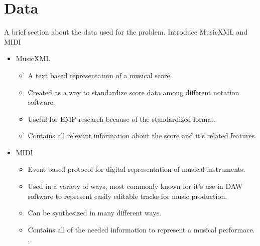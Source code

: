 
\section{Data}
A brief section about the data used for the problem. Introduce MusicXML and MIDI
\begin{itemize}
    \item MusicXML
    \begin{itemize}
        \item A text based representation of a musical score. 
        \item Created as a way to standardize score data among different notation software. 
        \item Useful for EMP research because of the standardized format. 
        \item Contains all relevant information about the score and it's related features. 
    \end{itemize}
    \item MIDI 
    \begin{itemize}
        \item Event based protocol for digital representation of musical instruments. 
        \item Used in a variety of ways, most commonly known for it's use in DAW software to represent easily editable tracks for music production. 
        \item Can be synthesized in many different ways. 
        \item Contains all of the needed information to represent a musical performace. . 
    \end{itemize}
    
\end{itemize}



